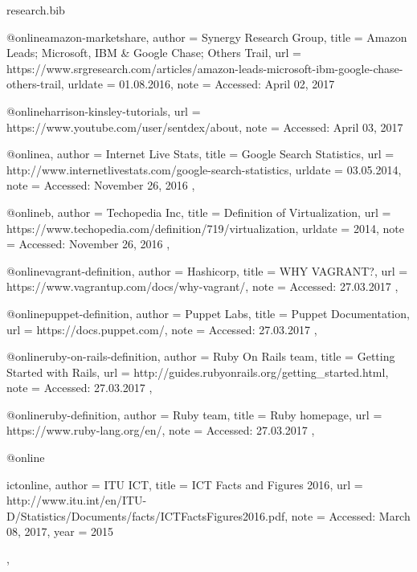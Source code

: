 \documentclass{article}
\begin{document}
\begin{filecontents*}{research.bib}
    
    @online{amazon-marketshare,
        author = {Synergy Research Group},
        title = {Amazon Leads; Microsoft, IBM \& Google Chase; Others Trail},
        url = {https://www.srgresearch.com/articles/amazon-leads-microsoft-ibm-google-chase-others-trail},
        urldate = {01.08.2016},
        note = {Accessed: April 02, 2017}
    }

    @online{harrison-kinsley-tutorials,
        url = {https://www.youtube.com/user/sentdex/about},
        note = {Accessed: April 03, 2017}
    }
    
    @online{a,
        author = {Internet Live Stats},
        title = {Google Search Statistics},
        url = {http://www.internetlivestats.com/google-search-statistics},
        urldate = {03.05.2014},
        note = {Accessed: November 26, 2016}
    },

    @online{b,
        author = {Techopedia Inc},
        title = {Definition of Virtualization},
        url = {https://www.techopedia.com/definition/719/virtualization},
        urldate = {2014},
        note = {Accessed: November 26, 2016}
    },

    @online{vagrant-definition,
        author = {Hashicorp},
        title = {WHY VAGRANT?},
        url = {https://www.vagrantup.com/docs/why-vagrant/},
        note = {Accessed: 27.03.2017}
    },

    @online{puppet-definition,
        author = {Puppet Labs},
        title = {Puppet Documentation},
        url = {https://docs.puppet.com/},
        note = {Accessed: 27.03.2017}
    },

    @online{ruby-on-rails-definition,
        author = {Ruby On Rails team},
        title = {Getting Started with Rails},
        url = {http://guides.rubyonrails.org/getting_started.html},
        note = {Accessed: 27.03.2017}
    },

    @online{ruby-definition,
        author = {Ruby team},
        title = {Ruby homepage},
        url = {https://www.ruby-lang.org/en/},
    note = {Accessed: 27.03.2017}
    },


    @online{ictonline,
        author = {ITU ICT},
        title = {ICT Facts and Figures 2016},
        url = {http://www.itu.int/en/ITU-D/Statistics/Documents/facts/ICTFactsFigures2016.pdf},
        note = {Accessed: March 08, 2017},
        year = {2015}

    },


\end{filecontents*}
\end{document}
